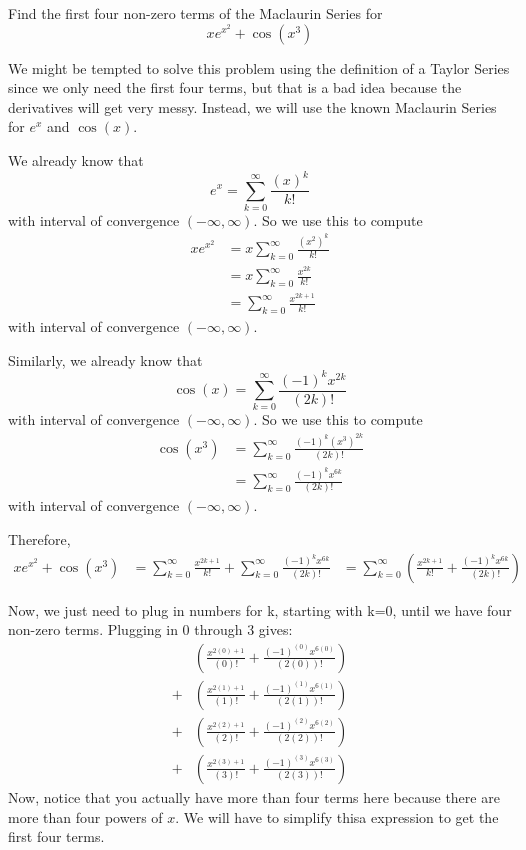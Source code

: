 \documentclass[noinstructornotes]{ximera}
\begin{document}
\begin{problem}
Find the first four non-zero terms of the Maclaurin Series for 
\[
 xe^{x^2}+\cos(x^3)
\]

\begin {freeResponse}
We might be tempted to solve this problem using the definition of a Taylor Series since we only need the first four terms, but that is a bad idea because the derivatives will get very messy.  Instead, we will use the known Maclaurin Series for $e^x$ and $\cos(x)$.

We already know that 
		\[
		e^x = \sum_{k=0}^\infty \frac{(x)^k}{k!}
		\]
	with interval of convergence $( - \infty, \infty)$.  
	So we use this to compute
		\begin{align*}
		x e^{x^2} &= x \sum_{k=0}^\infty \frac{(x^2)^k}{k!}  \\
		&= x \sum_{k=0}^\infty \frac{x^{2k}}{k!}  \\
		&= \sum_{k=0}^\infty \frac{x^{2k+1}}{k!}
		\end{align*}
	with interval of convergence $( - \infty, \infty)$.  
	
Similarly, we already know that 
		\[
		\cos(x) = \sum_{k=0}^\infty \frac{(-1)^k x^{2k}}{(2k)!}
		\]
	with interval of convergence $( - \infty, \infty)$.  
	So we use this to compute
		\begin{align*}
		\cos(x^3) &=  \sum_{k=0}^\infty \frac{(-1)^k (x^3)^{2k}}{(2k)!}  \\
		&= \sum_{k=0}^\infty \frac{(-1)^k x^{6k}}{(2k)!}
		\end{align*}
	with interval of convergence $( - \infty, \infty)$.  
	
	Therefore, 
	\begin{align*}
	 xe^{x^2}+\cos(x^3) &= \sum_{k=0}^\infty \frac{x^{2k+1}}{k!} + \sum_{k=0}^\infty \frac{(-1)^k x^{6k}}{(2k)!}
	 &= \sum_{k=0}^\infty \left(\frac{x^{2k+1}}{k!} + \frac{(-1)^k x^{6k}}{(2k)!}\right)
	 \end{align*}

Now, we just need to plug in numbers for k, starting with k=0, until we have four non-zero terms. Plugging in 0 through 3 gives:\\
\begin{align*}
&\left(\frac{x^{2(0)+1}}{(0)!} + \frac{(-1)^{(0)} x^{6(0)}}{(2(0))!}\right)\\ 
+ &\left(\frac{x^{2(1)+1}}{(1)!} + \frac{(-1)^{(1)} x^{6(1)}}{(2(1))!}\right)\\
+ &\left(\frac{x^{2(2)+1}}{(2)!} + \frac{(-1)^{(2)} x^{6(2)}}{(2(2))!}\right) \\
+ &\left(\frac{x^{2(3)+1}}{(3)!} + \frac{(-1)^{(3)} x^{6(3)}}{(2(3))!}\right)
\end{align*}
Now, notice that you actually have more than four terms here because there are more than four powers of $x$.  We will have to simplify thisa expression to get the first four terms.


\end{freeResponse}
\end{problem}
\end{document}
